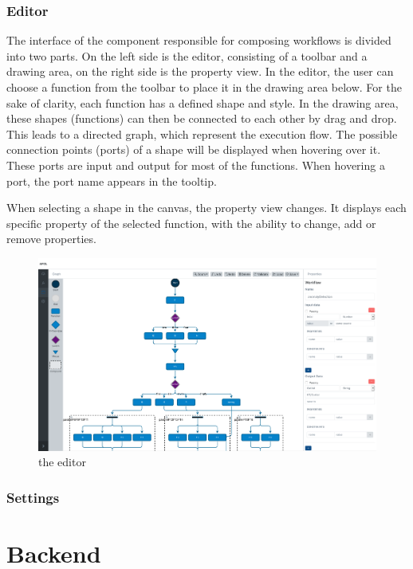 \documentclass[a4paper,12pt,pdftex,halfparskip,cleardoubleempty,bibtotoc,liststotoc]{scrbook}
\begin{document}
\subsubsection{Editor}
\par
The interface of the component responsible for composing workflows is divided into two parts. On the left side is the editor, consisting of a toolbar and a drawing area, on the right side is the property view. In the editor, the user can choose a function from the toolbar to place it in the drawing area below.  For the sake of clarity, each function has a defined shape and style. In the drawing area, these shapes (functions) can then be connected to each other by drag and drop. This leads to a directed graph, which represent the execution flow. The possible connection points (ports) of a shape will be displayed when hovering over it. These ports are input and output for most of the functions. When hovering a port, the port name appears in the tooltip.
\par
When selecting a shape in the canvas, the property view changes. It displays each specific property of the selected function, with the ability to change, add or remove properties.

\begin{figure}[H]
  \centering
  \includegraphics[width=\textwidth]{editor}
  \caption{the editor}
\end{figure}

\subsubsection{Settings}

\section{Backend}
\end{document}
